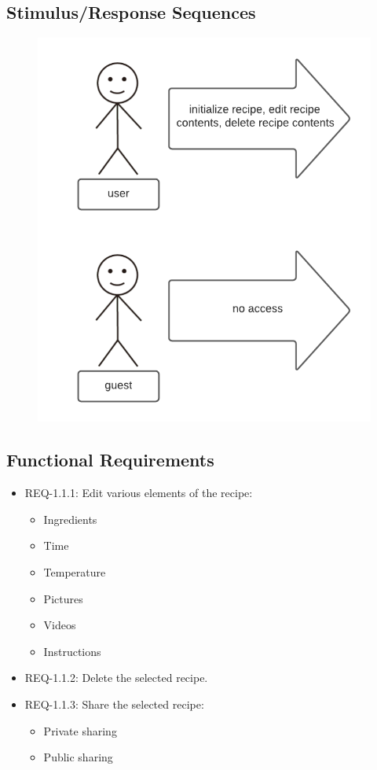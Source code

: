 \documentclass{scrreprt}
\begin{document}
\subsection{Stimulus/Response Sequences}

\begin{figure}[H]\centering
    \includegraphics[width=\columnwidth]{response diagrams/Recipe Creation.png}
\end{figure}

\subsection{\gls{Functional Requirements}}

\begin{itemize}
    \item REQ-1.1.1: Edit various elements of the recipe:
          \begin{itemize}
              \item Ingredients
              \item Time
              \item Temperature
              \item Pictures
              \item Videos
              \item Instructions
          \end{itemize}
    \item REQ-1.1.2: Delete the selected recipe.
    \item REQ-1.1.3: Share the selected recipe:
          \begin{itemize}
              \item Private sharing
              \item Public sharing
          \end{itemize}
\end{itemize}
\end{document}
